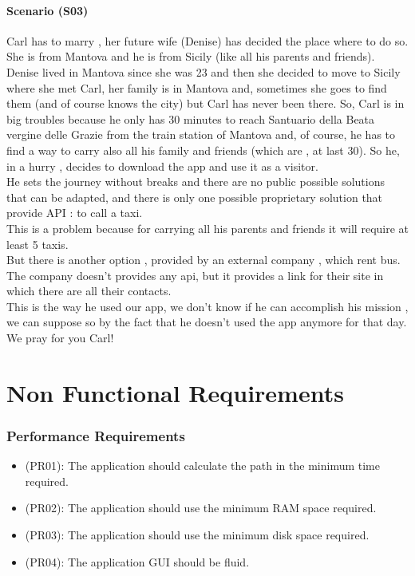 \documentclass[a4paper]{book}
\begin{document}
\subsection{Scenario (S03) }
Carl has to marry , her future wife (Denise) has decided the place where to do so.\\
She is from Mantova and he is from Sicily (like all his parents and friends).\\
Denise lived in Mantova since she was 23 and then she decided to move to Sicily where she met Carl, her family is in Mantova and, sometimes she goes to find them (and of course knows the city) but Carl has never been there.
So, Carl is in big troubles because he only has 30 minutes to reach Santuario della Beata vergine delle Grazie from the train station of Mantova and, of course, he has to find a way to carry also all his family and friends (which are , at last 30).
So he, in a hurry , decides to download the app and use it as a visitor.\\
He sets the journey without breaks and there are no public possible solutions that can be adapted, and there is only one possible proprietary solution that provide API : to call a taxi.\\
This is a problem because for carrying all his parents and friends it will require at least 5 taxis.\\
But there is another option , provided by an external company , which rent bus.\\
The company doesn't provides any api, but it provides a link for their site in which there are all their contacts.\\
This is the way he used our app, we don't know if he can accomplish his mission , we can suppose so by the fact that he doesn't used the app anymore for that day.\\
We pray for you Carl!\\

\part{Non Functional Requirements}

\section{Performance Requirements}
\begin{itemize}
\item (PR01): The application should calculate the path in the minimum time required.
\item (PR02): The application should use the minimum RAM space required.
\item (PR03): The application should use the minimum disk space required.
\item (PR04): The application GUI should be fluid.
\end{itemize}
\end{document}
